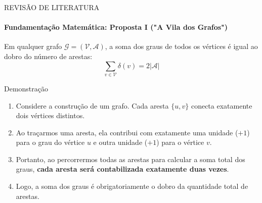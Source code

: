 \documentclass[10pt, aspectratio=169]{beamer}
\begin{document}
\begin{frame}{REVISÃO DE LITERATURA}
  \framesubtitle{Fundamentação Matemática: Proposta I ("A Vila dos Grafos")}
  \begin{tcolorbox}[colback=white, colframe=uescgreen, title=Lema 3.1: Lema do Aperto de Mão]
    Em qualquer grafo $\mathcal{G}=(\mathcal{V},\mathcal{A})$, a soma dos graus de todos os vértices é igual ao dobro do número de arestas:
    $$\sum_{v\in\mathcal{V}}\delta(v)=2|\mathcal{A}|$$
  \end{tcolorbox}
  
  \vspace{0.1cm}
  
  \begin{block}{Demonstração}
    \begin{enumerate}
        \item Considere a construção de um grafo. Cada aresta $\{u,v\}$ conecta exatamente dois vértices distintos.
        \item Ao traçarmos uma aresta, ela contribui com exatamente uma unidade ($+1$) para o grau do vértice $u$ e outra unidade ($+1$) para o vértice $v$.
        \item Portanto, ao percorrermos todas as arestas para calcular a soma total dos graus, \textbf{cada aresta será contabilizada exatamente duas vezes}.
        \item Logo, a soma dos graus é obrigatoriamente o dobro da quantidade total de arestas. \qedsymbol
    \end{enumerate}
  \end{block}
\end{frame}
\end{document}
